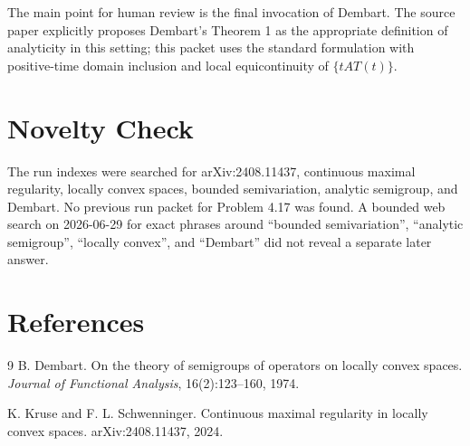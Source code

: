 \documentclass[11pt]{article}
\begin{document}
The main point for human review is the final invocation of Dembart.  The source
paper explicitly proposes Dembart's Theorem 1 as the appropriate definition of
analyticity in this setting; this packet uses the standard formulation with
positive-time domain inclusion and local equicontinuity of $\{tAT(t)\}$.

\section*{Novelty Check}

The run indexes were searched for arXiv:2408.11437, continuous maximal
regularity, locally convex spaces, bounded semivariation, analytic semigroup,
and Dembart.  No previous run packet for Problem 4.17 was found.  A bounded web
search on 2026-06-29 for exact phrases around ``bounded semivariation'',
``analytic semigroup'', ``locally convex'', and ``Dembart'' did not reveal a
separate later answer.

\section*{References}

\begin{thebibliography}{9}
B. Dembart.
\newblock On the theory of semigroups of operators on locally convex spaces.
\newblock \emph{Journal of Functional Analysis}, 16(2):123--160, 1974.

K. Kruse and F. L. Schwenninger.
\newblock Continuous maximal regularity in locally convex spaces.
\newblock arXiv:2408.11437, 2024.
\end{thebibliography}
\end{document}
